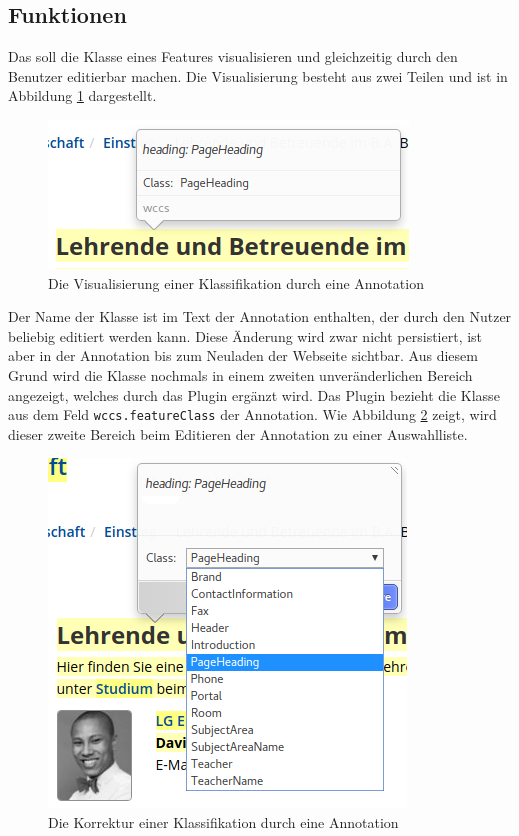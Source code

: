 \subsection{Funktionen}
    Das {\annotatorPlugin} soll die Klasse eines Features visualisieren und gleichzeitig
    durch den Benutzer editierbar machen.
    Die Visualisierung besteht aus zwei Teilen und ist in Abbildung
    \ref{image:annotatorPluginViewer} dargestellt.

    \begin{figure}[htb]
        \centering
        \includegraphics[scale=0.7]{../resources/annotator-plugin/viewer.png}
        \caption{Die Visualisierung einer Klassifikation durch eine Annotation}
        \label{image:annotatorPluginViewer}
    \end{figure}

    Der Name der Klasse ist im Text der Annotation
    enthalten,
    der durch den Nutzer beliebig editiert werden kann.
    Diese Änderung wird zwar nicht
    persistiert,
    ist aber in der Annotation bis zum Neuladen der Webseite sichtbar.
    Aus diesem Grund wird die Klasse nochmals in einem zweiten unveränderlichen Bereich angezeigt,
    welches durch das Plugin ergänzt wird.
    Das Plugin bezieht die Klasse aus dem Feld \texttt{wccs.featureClass}
    der Annotation.
    Wie Abbildung \ref{image:annotatorPluginEditor} zeigt,
    wird dieser zweite Bereich beim Editieren der Annotation zu einer Auswahlliste.

    \begin{figure}[htb]
        \centering
        \includegraphics[scale=0.7]{../resources/annotator-plugin/editor.png}
        \caption{Die Korrektur einer Klassifikation durch eine Annotation}
        \label{image:annotatorPluginEditor}
    \end{figure}

